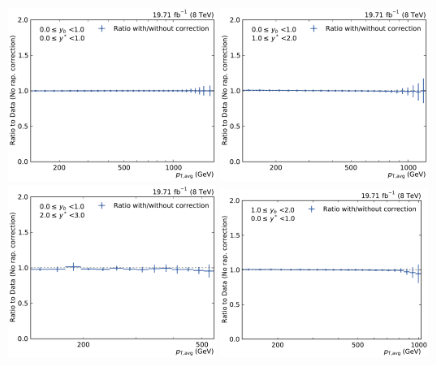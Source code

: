 \begin{figure}[htbp]
    \centering
    \includegraphics[width=0.49\textwidth]{figures/measurement/rap_corr_data_yb0ys0.pdf}\hfill
    \includegraphics[width=0.49\textwidth]{figures/measurement/rap_corr_data_yb0ys1.pdf}
    \includegraphics[width=0.49\textwidth]{figures/measurement/rap_corr_data_yb0ys2.pdf}\hfill
    \includegraphics[width=0.49\textwidth]{figures/measurement/rap_corr_data_yb1ys0.pdf}

\end{figure}
